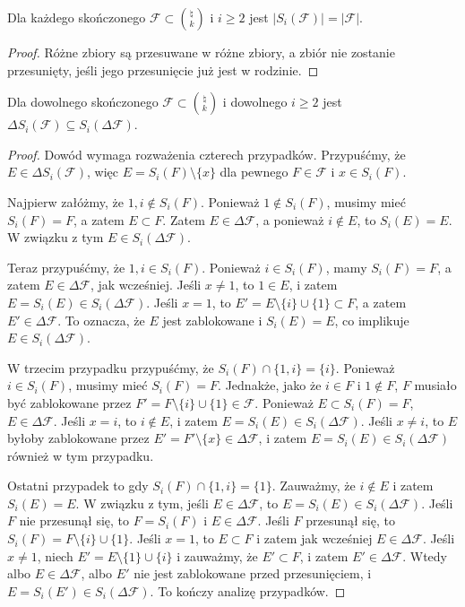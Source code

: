 \begin{lemma}
	\label{kk_rozmiar}
	Dla każdego skończonego \(\mathcal F\subset \binom{\natural}{k}\) i \(i\ge 2\) jest
	\(|S_i(\mathcal F)| = |\mathcal F|\).
\end{lemma}
\begin{proof}
	Różne zbiory są przesuwane w różne zbiory, a zbiór nie zostanie przesunięty,
	jeśli jego przesunięcie już jest w rodzinie.
\end{proof}

\begin{lemma}
	\label{kk_zamiana}
	Dla dowolnego skończonego \(\mathcal F \subset \binom{\natural}{k}\) i dowolnego \(i
	\geq 2\) jest \(\Delta S_i(\mathcal F) \subseteq S_i(\Delta\mathcal F)\).
\end{lemma}
\begin{proof}
	Dowód wymaga rozważenia czterech przypadków. Przypuśćmy, że \(E \in \Delta
	S_i(\mathcal F)\), więc \(E = S_i(F) \setminus \{x\}\) dla pewnego \(F \in
	\mathcal F\) i \(x \in S_i(F)\).

	Najpierw załóżmy, że \(1, i \notin S_i(F)\). Ponieważ \(1 \notin S_i(F)\), musimy
	mieć \(S_i(F) = F\), a zatem \(E \subset F\). Zatem \(E \in \Delta\mathcal  F\), a
	ponieważ \(i \notin E\), to \(S_i(E) = E\). W związku z tym \(E \in
	S_i(\Delta\mathcal F)\).

	Teraz przypuśćmy, że \(1, i \in S_i(F)\). Ponieważ \(i \in S_i(F)\), mamy \(S_i(F)
	= F\), a zatem \(E \in \Delta\mathcal F\), jak wcześniej. Jeśli \(x \neq 1\), to
	\(1 \in E\), i zatem \(E = S_i(E) \in S_i(\Delta\mathcal F)\). Jeśli \(x = 1\), to
	\(E' = E \setminus \{i\} \cup \{1\} \subset F\), a zatem \(E' \in \Delta\mathcal
	F\). To oznacza, że \(E\) jest zablokowane i \(S_i(E) = E\), co implikuje \(E \in
	S_i(\Delta\mathcal F)\).

	W trzecim przypadku przypuśćmy, że \(S_i(F) \cap \{1, i\} = \{i\}\). Ponieważ \(i
	\in S_i(F)\), musimy mieć \(S_i(F) = F\). Jednakże, jako że \(i \in F\) i \(1
	\notin F\), \(F\) musiało być zablokowane przez \(F' = F \setminus \{i\} \cup
	\{1\} \in\mathcal F\). Ponieważ \(E \subset S_i(F) = F\), \(E \in \Delta\mathcal
	F\). Jeśli \(x = i\), to \(i \notin E\), i zatem \(E = S_i(E) \in
	S_i(\Delta\mathcal F)\). Jeśli \(x \neq i\), to \(E\) byłoby zablokowane przez \(E'
	= F' \setminus \{x\} \in \Delta\mathcal F\), i zatem \(E = S_i(E) \in
	S_i(\Delta\mathcal F)\) również w tym przypadku.

	Ostatni przypadek to gdy \(S_i(F) \cap \{1, i\} = \{1\}\). Zauważmy, że \(i
	\notin E\) i zatem \(S_i(E) = E\). W związku z tym, jeśli \(E \in \Delta\mathcal
	F\), to \(E = S_i(E) \in S_i(\Delta\mathcal F)\). Jeśli \(F\) nie przesunął się,
	to \(F = S_i(F)\) i \(E \in \Delta\mathcal F\). Jeśli \(F\) przesunął się, to
	\(S_i(F) = F \setminus \{i\} \cup \{1\}\). Jeśli \(x = 1\), to \(E \subset F\) i
	zatem jak wcześniej \(E \in \Delta\mathcal F\). Jeśli \(x \neq 1\), niech \(E' = E
	\setminus \{1\} \cup \{i\}\) i zauważmy, że \(E' \subset F\), i zatem \(E' \in
	\Delta\mathcal F\). Wtedy albo \(E \in \Delta\mathcal F\), albo \(E'\) nie jest
	zablokowane przed przesunięciem, i \(E = S_i(E') \in S_i(\Delta\mathcal F)\).
	To kończy analizę przypadków.
\end{proof}


